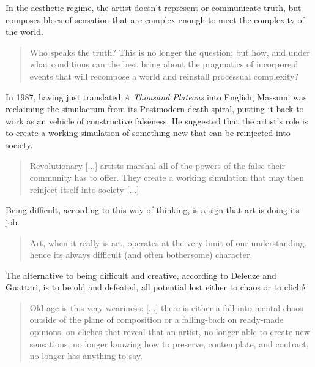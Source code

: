         In the aesthetic regime, the artist doesn't represent or communicate truth, but composes blocs of sensation that are complex enough to meet the complexity of the world.

        \begin{quote}
            Who speaks the truth? This is no longer the question; but how, and under what conditions can the best bring about the pragmatics of incorporeal events that will recompose a world and reinstall processual complexity? \citep[p.86]{GuattariChsmss1995}
        \end{quote}

        In 1987, having just translated \emph{A Thousand Plateaus} into English, Massumi was reclaiming the simulacrum from its Postmodern death spiral, putting it back to work as an vehicle of constructive falseness. He suggested that the artist's role is to create a working simulation of something new that can be reinjected into society.

        \begin{quote}
            Revolutionary [...] artists marshal all of the powers of the false their community has to offer. They create a working simulation that may then reinject itself into society [...] \citep{MassumiRlrThnRl2021}
        \end{quote}

        Being difficult, according to this way of thinking, is a sign that art is doing its job. 

        \begin{quote}
            Art, when it really is art, operates at the very limit of our understanding, hence its always difficult (and often bothersome) character. \citep[p.199]{ZepkeOSullivanDlzCntmprryArt2010}
        \end{quote}

        The alternative to being difficult and creative, according to Deleuze and Guattari, is to be old and defeated, all potential lost either to chaos or to cliché.

        \begin{quote}
            Old age is this very weariness: [...] there is either a fall into mental chaos outside of the plane of composition or a falling-back on ready-made opinions, on cliches that reveal that an artist, no longer able to create new sensations, no longer knowing how to preserve, contemplate, and contract, no longer has anything to say. \citep[p.214]{DeleuzeGuattariWhatIsPhilosophy1994}
        \end{quote}

